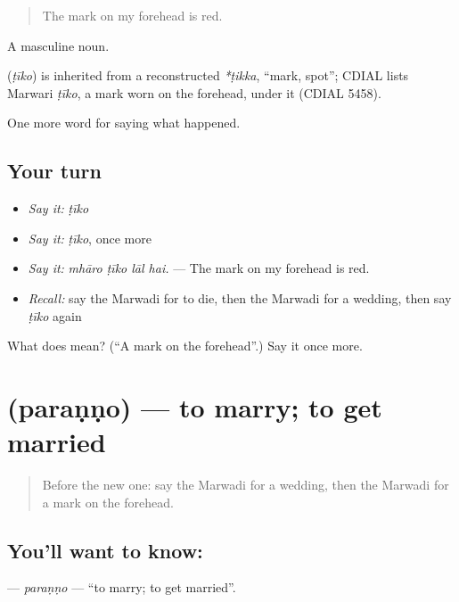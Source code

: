 \begin{quote}
The mark on my forehead is red.
\end{quote}

A masculine noun.

\begin{cousinweb}
\textbf{} (\emph{ṭīko}) is inherited from a reconstructed \emph{*ṭikka}, \textquotedblleft{}mark, spot\textquotedblright{}; CDIAL lists Marwari \emph{ṭīko}, a mark worn on the forehead, under it (CDIAL 5458).
\end{cousinweb}

\begin{grammarlens}[title={What you've built}]
One more word for saying what happened.
\end{grammarlens}

\subsection*{Your turn}
\begin{itemize}
\raggedright
  \item \emph{Say it:} \emph{ṭīko}
  \item \emph{Say it:} \emph{ṭīko}, once more
  \item \emph{Say it:} \emph{mhāro ṭīko lāl hai.} — The mark on my forehead is red.
  \item \emph{Recall:} say the Marwadi for to die, then the Marwadi for a wedding, then say \emph{ṭīko} again
\end{itemize}

\begin{tcolorbox}[breakable,colback=teal!4,colframe=teal!35!black,title={Before you move on}]
What does  mean? (\textquotedblleft{}A mark on the forehead\textquotedblright{}.) Say it once more.
\end{tcolorbox}
\section[\texorpdfstring{\mw{परणणो} (paraṇṇo)}{परणणो (paraṇṇo)}]{ (paraṇṇo) — to marry; to get married}

\label{lesson:MW-C247-paranno}



\begin{quote}
Before the new one: say the Marwadi for a wedding, then the Marwadi for a mark on the forehead.
\end{quote}

\subsection*{You'll want to know: }
\textbf{} — \emph{paraṇṇo} — \textquotedblleft{}to marry; to get married\textquotedblright{}.

